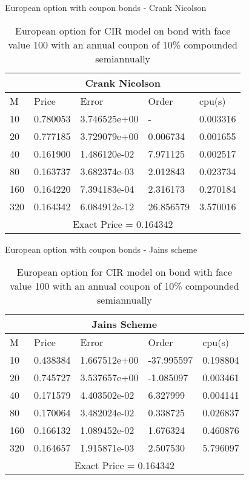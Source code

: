 \documentclass{beamer}
\begin{document}
 \begin{frame}{European option with coupon bonds - Crank Nicolson}
    \begin{table}[htp]
    \begin{tabular}{ |p{1cm}|p{1.7cm}|p{2.5cm}|p{2cm}|p{1.5cm}|  }
    
     \hline
      \multicolumn{5}{|c|}{Crank Nicolson} \\
     \hline
     M & Price & Error & Order & cpu(s)\\
     \hline
    10 & 0.780053 & 3.746525e+00 &  - & 0.003316\\
    20 & 0.777185 & 3.729079e+00 & 0.006734 & 0.001655\\
    40 & 0.161900 & 1.486120e-02 & 7.971125 & 0.002517\\
    80 & 0.163737 & 3.682374e-03 & 2.012843 & 0.023734\\
    160 & 0.164220 & 7.394183e-04 & 2.316173 & 0.270184\\
    320 & 0.164342 & 6.084912e-12 & 26.856579 & 3.570016\\
     \hline
     \multicolumn{5}{|c|}{Exact Price = 0.164342} \\
     \hline
     
    \end{tabular}
    \caption{ European option for CIR model on bond with face value 100 with an annual coupon of 10\% compounded semiannually}
        
    \end{table}
\end{frame}
 

 \begin{frame}{European option with coupon bonds - Jains scheme}
    \begin{table}[htp]
    \begin{tabular}{ |p{1cm}|p{1.7cm}|p{2.5cm}|p{2cm}|p{1.5cm}|  }
    
     \hline
     \multicolumn{5}{|c|}{Jains Scheme} \\
     \hline
     M & Price & Error & Order & cpu(s)\\
     \hline
    10 & 0.438384 & 1.667512e+00 & -37.995597 & 0.198804\\
    20 & 0.745727 & 3.537657e+00 & -1.085097 & 0.003461\\
    40 & 0.171579 & 4.403502e-02 & 6.327999 & 0.004141\\
    80 & 0.170064 & 3.482024e-02 & 0.338725 & 0.026837\\
    160 & 0.166132 & 1.089452e-02 & 1.676324 & 0.460876\\
    320 & 0.164657 & 1.915871e-03 & 2.507530 & 5.796097\\
     \hline
     \multicolumn{5}{|c|}{Exact Price = 0.164342} \\
     \hline
     
    \end{tabular}
    \caption{ European option for CIR model on bond with face value 100 with an annual coupon of 10\% compounded semiannually}
        
    \end{table}
\end{frame}
 
\end{document}
